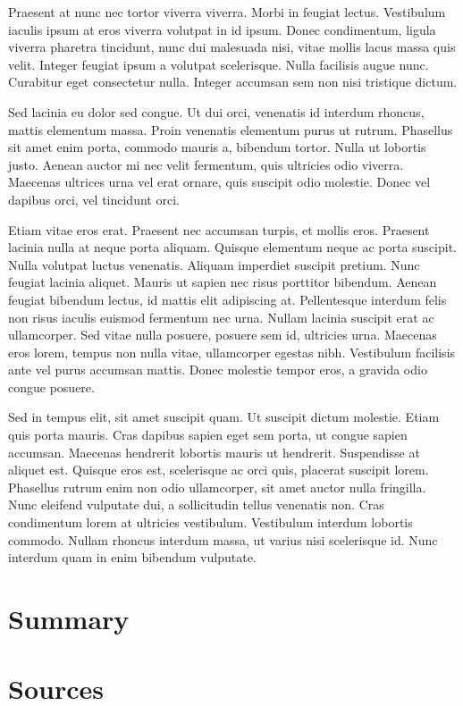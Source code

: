 \documentclass[12pt,oneside,a4paper,parskip]{scrbook}
\begin{document}
Praesent at nunc nec tortor viverra viverra. Morbi in feugiat lectus. Vestibulum iaculis ipsum at eros viverra volutpat in id ipsum. Donec condimentum, ligula viverra pharetra tincidunt, nunc dui malesuada nisi, vitae mollis lacus massa quis velit. Integer feugiat ipsum a volutpat scelerisque. Nulla facilisis augue nunc. Curabitur eget consectetur nulla. Integer accumsan sem non nisi tristique dictum.

Sed lacinia eu dolor sed congue. Ut dui orci, venenatis id interdum rhoncus, mattis elementum massa. Proin venenatis elementum purus ut rutrum. Phasellus sit amet enim porta, commodo mauris a, bibendum tortor. Nulla ut lobortis justo. Aenean auctor mi nec velit fermentum, quis ultricies odio viverra. Maecenas ultrices urna vel erat ornare, quis suscipit odio molestie. Donec vel dapibus orci, vel tincidunt orci.

Etiam vitae eros erat. Praesent nec accumsan turpis, et mollis eros. Praesent lacinia nulla at neque porta aliquam. Quisque elementum neque ac porta suscipit. Nulla volutpat luctus venenatis. Aliquam imperdiet suscipit pretium. Nunc feugiat lacinia aliquet. Mauris ut sapien nec risus porttitor bibendum. Aenean feugiat bibendum lectus, id mattis elit adipiscing at. Pellentesque interdum felis non risus iaculis euismod fermentum nec urna. Nullam lacinia suscipit erat ac ullamcorper. Sed vitae nulla posuere, posuere sem id, ultricies urna. Maecenas eros lorem, tempus non nulla vitae, ullamcorper egestas nibh. Vestibulum facilisis ante vel purus accumsan mattis. Donec molestie tempor eros, a gravida odio congue posuere.

Sed in tempus elit, sit amet suscipit quam. Ut suscipit dictum molestie. Etiam quis porta mauris. Cras dapibus sapien eget sem porta, ut congue sapien accumsan. Maecenas hendrerit lobortis mauris ut hendrerit. Suspendisse at aliquet est. Quisque eros est, scelerisque ac orci quis, placerat suscipit lorem. Phasellus rutrum enim non odio ullamcorper, sit amet auctor nulla fringilla. Nunc eleifend vulputate dui, a sollicitudin tellus venenatis non. Cras condimentum lorem at ultricies vestibulum. Vestibulum interdum lobortis commodo. Nullam rhoncus interdum massa, ut varius nisi scelerisque id. Nunc interdum quam in enim bibendum vulputate.

\chapter{Summary}

\chapter{Sources}
\end{document}
